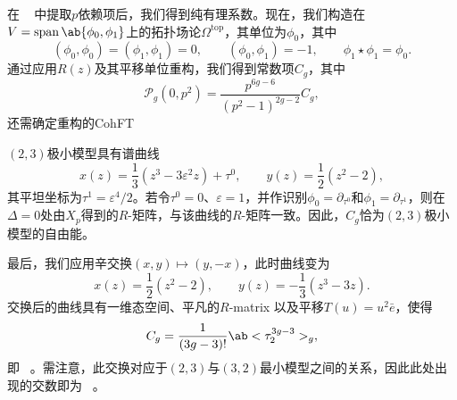 \documentclass{amsart}
\theoremstyle{definition}
\theoremstyle{remark}
\theoremstyle{plain}
\theoremstyle{definition}
\theoremstyle{remark}
\newcommand{\ep}{\varepsilon}
\newcommand{\mc}[1]{\mathcal{#1}}
\newcommand{\mr}[1]{\mathrm{#1}}
\newcommand{\on}[1]{\operatorname{#1}}
\newcommand{\1}{\mathbf{1}}
\newcommand{\2}{\mathbf{2}}
\newcommand{\3}{\mathbf{3}}
\begin{document}
在 ~ 中提取\(p\)依赖项后，我们得到纯有理系数。现在，我们构造在\(V = \on{span}\ab\{\phi_0,\phi_1\}\)上的拓扑场论\(\Omega^{\mr{top}}\)，其单位为\(\phi_0\)，其中
\[ (\phi_0,\phi_0) = (\phi_1,\phi_1) = 0, \qquad (\phi_0,\phi_1) = -1, \qquad \phi_1 \star \phi_1 = \phi_0. \]
通过应用\(R(z)\)及其平移单位重构，我们得到常数项\(C_g\)，其中
\[ \mc{P}_g(0,p^2) = \frac{p^{6g-6}}{(p^2-1)^{2g-2}}C_g, \]
还需确定重构的CohFT

\((2,3)\)极小模型具有谱曲线
\[ x(z) = \frac{1}{3}(z^3-3\ep^2 z) + \tau^0, \qquad y(z) = \frac{1}{2}(z^2-2), \]
其平坦坐标为\(\tau^1 = \ep^4/2\)。若令\(\tau^0 = 0\)、\(\ep = 1\)，并作识别\(\phi_0 = \partial_{\tau^0}\)和\(\phi_1 = \partial_{\tau^1}\)，则在\(\Delta = 0\)处由\(X_p\)得到的\(R\)-矩阵，与该曲线的\(R\)-矩阵一致。因此，\(C_g\)恰为\((2,3)\)极小模型的自由能。

最后，我们应用辛交换\((x,y) \mapsto (y,-x)\)，此时曲线变为
\[ x(z) = \frac{1}{2}(z^2-2), \qquad y(z) = -\frac{1}{3}(z^3-3z). \]
交换后的曲线具有一维态空间、平凡的\(R\)-matrix 以及平移\(T(u) = u^2 \bar{e}\)，使得
\[ C_g = \frac{1}{(3g-3)!}\ab<\tau_2^{3g-3}>_g, \]
即 ~。需注意，此交换对应于\((2,3)\)与\((3,2)\)最小模型之间的关系，因此此处出现的交数即为 ~。

\printbibliography[title={参考文献}]
\end{document}
